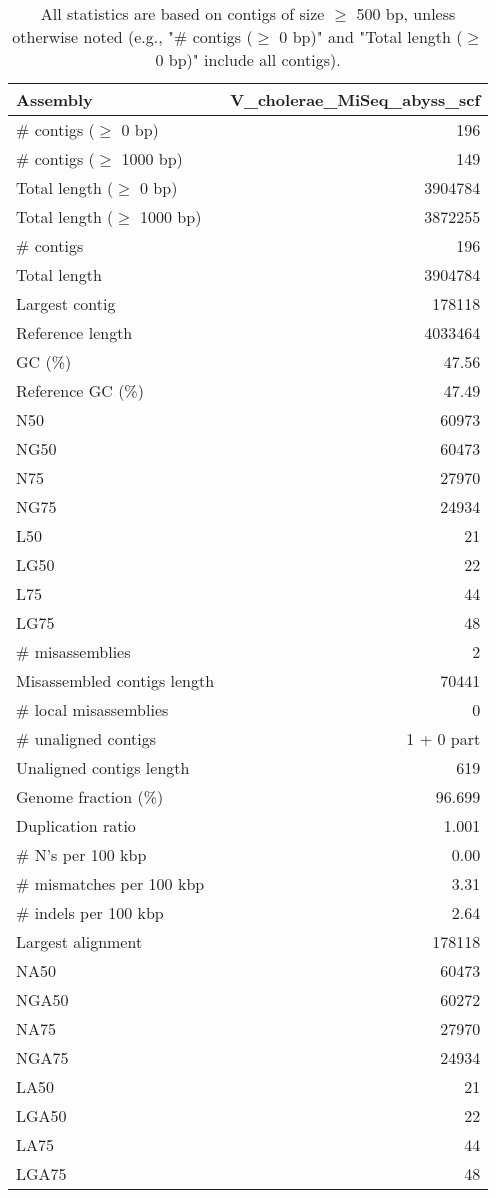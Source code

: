 \documentclass[12pt,a4paper]{article}
\begin{document}
\begin{table}[ht]
\begin{center}
\caption{All statistics are based on contigs of size $\geq$ 500 bp, unless otherwise noted (e.g., "\# contigs ($\geq$ 0 bp)" and "Total length ($\geq$ 0 bp)" include all contigs).}
\begin{tabular}{|l*{1}{|r}|}
\hline
Assembly & V\_cholerae\_MiSeq\_abyss\_scf \\ \hline
\# contigs ($\geq$ 0 bp) & 196 \\ \hline
\# contigs ($\geq$ 1000 bp) & 149 \\ \hline
Total length ($\geq$ 0 bp) & 3904784 \\ \hline
Total length ($\geq$ 1000 bp) & 3872255 \\ \hline
\# contigs & 196 \\ \hline
Total length & 3904784 \\ \hline
Largest contig & 178118 \\ \hline
Reference length & 4033464 \\ \hline
GC (\%) & 47.56 \\ \hline
Reference GC (\%) & 47.49 \\ \hline
N50 & 60973 \\ \hline
NG50 & 60473 \\ \hline
N75 & 27970 \\ \hline
NG75 & 24934 \\ \hline
L50 & 21 \\ \hline
LG50 & 22 \\ \hline
L75 & 44 \\ \hline
LG75 & 48 \\ \hline
\# misassemblies & 2 \\ \hline
Misassembled contigs length & 70441 \\ \hline
\# local misassemblies & 0 \\ \hline
\# unaligned contigs & 1 + 0 part \\ \hline
Unaligned contigs length & 619 \\ \hline
Genome fraction (\%) & 96.699 \\ \hline
Duplication ratio & 1.001 \\ \hline
\# N's per 100 kbp & 0.00 \\ \hline
\# mismatches per 100 kbp & 3.31 \\ \hline
\# indels per 100 kbp & 2.64 \\ \hline
Largest alignment & 178118 \\ \hline
NA50 & 60473 \\ \hline
NGA50 & 60272 \\ \hline
NA75 & 27970 \\ \hline
NGA75 & 24934 \\ \hline
LA50 & 21 \\ \hline
LGA50 & 22 \\ \hline
LA75 & 44 \\ \hline
LGA75 & 48 \\ \hline
\end{tabular}
\end{center}
\end{table}
\end{document}
